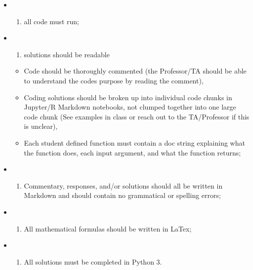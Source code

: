 \documentclass[
  12pt,
]{article}
\providecommand{\tightlist}{%
  \setlength{\itemsep}{0pt}\setlength{\parskip}{0pt}}
\begin{document}
\begin{itemize}
\item
  \begin{enumerate}
  \def\labelenumi{(\roman{enumi})}
  \tightlist
  \item
    all code must run;
  \end{enumerate}
\item
  \begin{enumerate}
  \def\labelenumi{(\roman{enumi})}
  \setcounter{enumi}{1}
  \tightlist
  \item
    solutions should be readable
  \end{enumerate}

  \begin{itemize}
  \tightlist
  \item
    Code should be thoroughly commented (the Professor/TA should be able
    to understand the codes purpose by reading the comment),
  \item
    Coding solutions should be broken up into individual code chunks in
    Jupyter/R Markdown notebooks, not clumped together into one large
    code chunk (See examples in class or reach out to the TA/Professor
    if this is unclear),
  \item
    Each student defined function must contain a doc string explaining
    what the function does, each input argument, and what the function
    returns;
  \end{itemize}
\item
  \begin{enumerate}
  \def\labelenumi{(\roman{enumi})}
  \setcounter{enumi}{2}
  \tightlist
  \item
    Commentary, responses, and/or solutions should all be written in
    Markdown and should contain no grammatical or spelling errors;
  \end{enumerate}
\item
  \begin{enumerate}
  \def\labelenumi{(\roman{enumi})}
  \setcounter{enumi}{3}
  \tightlist
  \item
    All mathematical formulas should be written in LaTex;
  \end{enumerate}
\item
  \begin{enumerate}
  \def\labelenumi{(\alph{enumi})}
  \setcounter{enumi}{21}
  \tightlist
  \item
    All solutions must be completed in Python 3.
  \end{enumerate}
\end{itemize}
\end{document}
